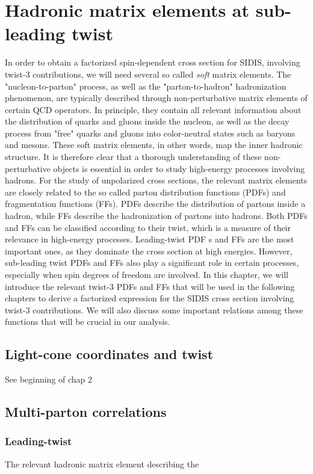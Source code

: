 \chapter{Hadronic matrix elements at sub-leading twist}
In order to obtain a factorized spin-dependent cross section for SIDIS, involving twist-3 contributions, we will need several so called \textit{soft} matrix elements. The "nucleon-to-parton" process, as well as the "parton-to-hadron" hadronization phenomenon, are typically described through non-perturbative matrix elements of certain QCD operators. In principle, they contain all relevant information about the distribution of quarks and gluons inside the nucleon, as well as the decay process from "free" quarks and gluons into color-neutral states such as baryons and mesons. These soft matrix elements, in other words, map the inner hadronic structure. It is therefore clear that a thorough understanding of these non-perturbative objects is essential in order to study high-energy processes involving hadrons.
For the study of unpolarized cross sections, the relevant matrix elements are closely related to the so called parton distribution functions (PDFs) and fragmentation functions (FFs). PDFs describe the distribution of partons inside a hadron, while FFs describe the hadronization of partons into hadrons. Both PDFs and FFs can be classified according to their twist, which is a measure of their relevance in high-energy processes. Leading-twist PDF s and FFs are the most important ones, as they dominate the cross section at high energies. However, sub-leading twist PDFs and FFs also play a significant role in certain processes, especially when spin degrees of freedom are involved. In this chapter, we will introduce the relevant twist-3 PDFs and FFs that will be used in the following chapters to derive a factorized expression for the SIDIS cross section involving twist-3 contributions. We will also discuss some important relations among these functions that will be crucial in our analysis.

\section{Light-cone coordinates and twist}
See beginning of chap 2

\section{Multi-parton correlations}

\subsection{Leading-twist }
The relevant hadronic matrix element describing the 


